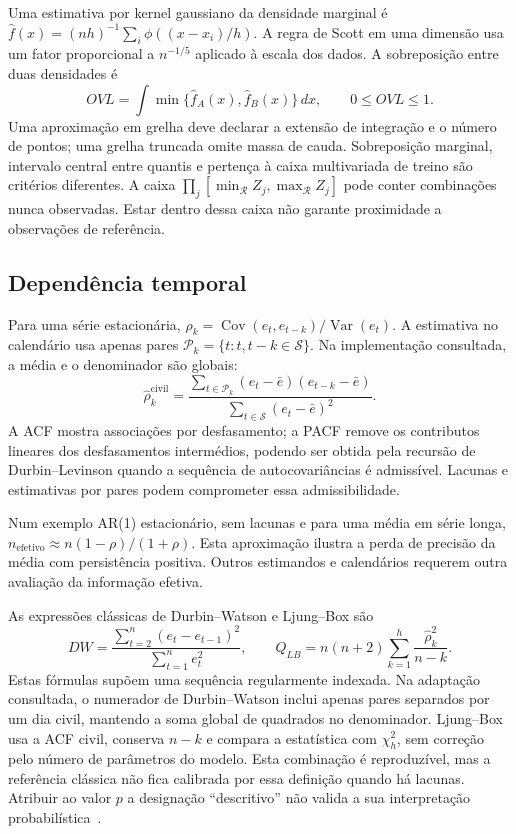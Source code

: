 Uma estimativa por kernel gaussiano da densidade marginal é $\widehat f(x)=(nh)^{-1}\sum_i\phi((x-x_i)/h)$. A regra de Scott em uma dimensão usa um fator proporcional a $n^{-1/5}$ aplicado à escala dos dados. A sobreposição entre duas densidades é
\begin{equation}
OVL=\int\min\{\widehat f_A(x),\widehat f_B(x)\}\,dx,
\qquad 0\leq OVL\leq1.
\label{eq:mat-overlap}
\end{equation}
Uma aproximação em grelha deve declarar a extensão de integração e o número de pontos; uma grelha truncada omite massa de cauda. Sobreposição marginal, intervalo central entre quantis e pertença à caixa multivariada de treino são critérios diferentes. A caixa $\prod_j[\min_{\mathcal R}Z_j,\max_{\mathcal R}Z_j]$ pode conter combinações nunca observadas. Estar dentro dessa caixa não garante proximidade a observações de referência.

\subsection{Dependência temporal}
\label{sec:mat-acf}
Para uma série estacionária, $\rho_k=\operatorname{Cov}(e_t,e_{t-k})/\operatorname{Var}(e_t)$. A estimativa no calendário usa apenas pares $\mathcal P_k=\{t:t,t-k\in\mathcal S\}$. Na implementação consultada, a média e o denominador são globais:
\begin{equation}
\widehat\rho_k^{\mathrm{civil}}=
\frac{\sum_{t\in\mathcal P_k}(e_t-\bar e)(e_{t-k}-\bar e)}
{\sum_{t\in\mathcal S}(e_t-\bar e)^2}.
\label{eq:mat-acf-civil}
\end{equation}
A ACF mostra associações por desfasamento; a PACF remove os contributos lineares dos desfasamentos intermédios, podendo ser obtida pela recursão de Durbin--Levinson quando a sequência de autocovariâncias é admissível. Lacunas e estimativas por pares podem comprometer essa admissibilidade.

Num exemplo AR(1) estacionário, sem lacunas e para uma média em série longa, $n_{\mathrm{efetivo}}\approx n(1-\rho)/(1+\rho)$. Esta aproximação ilustra a perda de precisão da média com persistência positiva. Outros estimandos e calendários requerem outra avaliação da informação efetiva.

As expressões clássicas de
Durbin--Watson e
Ljung--Box são
\begin{equation}
DW=\frac{\sum_{t=2}^{n}(e_t-e_{t-1})^2}{\sum_{t=1}^{n}e_t^2},
\qquad Q_{LB}=n(n+2)\sum_{k=1}^{h}\frac{\widehat\rho_k^2}{n-k}.
\label{eq:mat-dw-lb}
\end{equation}
Estas fórmulas supõem uma sequência regularmente indexada. Na adaptação consultada, o numerador de Durbin--Watson inclui apenas pares separados por um dia civil, mantendo a soma global de quadrados no denominador. Ljung--Box usa a ACF civil, conserva $n-k$ e compara a estatística com $\chi^2_h$, sem correção pelo número de parâmetros do modelo. Esta combinação é reproduzível, mas a referência clássica não fica calibrada por essa definição quando há lacunas. Atribuir ao valor $p$ a designação ``descritivo'' não valida a sua interpretação probabilística~\parencite{BoxJenkins2015}.

